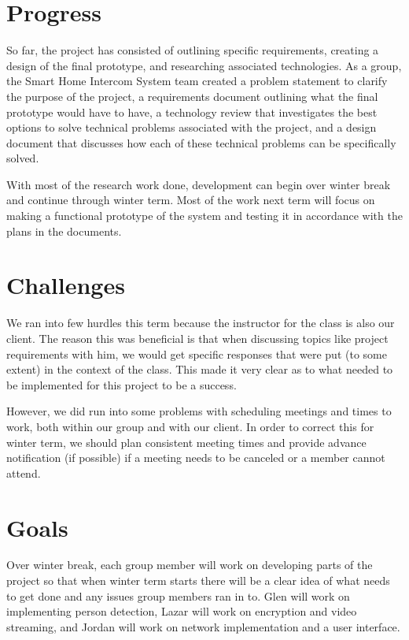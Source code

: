 \documentclass[onecolumn, draftclsnofoot,10pt, compsoc]{IEEEtran}
\begin{document}
\section{Progress}
So far, the project has consisted of outlining specific requirements, creating a design of the final prototype, and researching associated technologies. As a group, the Smart Home Intercom System team created a problem statement to clarify the purpose of the project, a requirements document outlining what the final prototype would have to have, a technology review that investigates the best options to solve technical problems associated with the project, and a design document that discusses how each of these technical problems can be specifically solved.  

With most of the research work done, development can begin over winter break and continue through winter term. Most of the work next term will focus on making a functional prototype of the system and testing it in accordance with the plans in the documents.

\section{Challenges}
We ran into few hurdles this term because the instructor for the class is also our client. The reason this was beneficial is that when discussing topics like project requirements with him, we would get specific responses that were put (to some extent) in the context of the class. This made it very clear as to what needed to be implemented for this project to be a success. 

However, we did run into some problems with scheduling meetings and times to work, both within our group and with our client. In order to correct this for winter term, we should plan consistent meeting times and provide advance notification (if possible) if a meeting needs to be canceled or a member cannot attend. 

\section{Goals}
Over winter break, each group member will work on developing parts of the project so that when winter term starts there will be a clear idea of what needs to get done and any issues group members ran in to. Glen will work on implementing person detection, Lazar will work on encryption and video streaming, and Jordan will work on network implementation and a user interface. 
\end{document}
